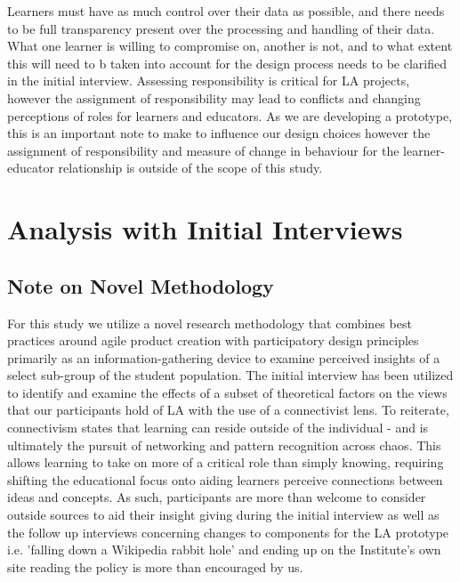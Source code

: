 \documentclass{l4proj}
\begin{document}
Learners must have as much control over their data as possible, and there needs to be full transparency present over the processing and handling of their data. What one learner is willing to compromise on, another is not, and to what extent this will need to b taken into account for the design process needs to be clarified in the initial interview. Assessing responsibility is critical for LA projects, however the assignment of responsibility may lead to conflicts and changing perceptions of roles for learners and educators. As we are developing a prototype, this is an important note to make to influence our design choices however the assignment of responsibility and measure of change in behaviour for the learner-educator relationship is outside of the scope of this study.




\chapter{Analysis with Initial Interviews}

\section{Note on Novel Methodology}
For this study we utilize a novel research methodology that combines best practices around agile product creation with participatory design principles primarily as an information-gathering device to examine perceived insights of a select sub-group of the student population. The initial interview has been utilized to identify and examine the effects of a subset of theoretical factors on the views that our participants hold of LA with the use of a connectivist lens. To reiterate, connectivism states that learning can reside outside of the individual - and is ultimately the pursuit of networking and pattern recognition across chaos. This allows learning to take on more of a critical role than simply knowing, requiring shifting the educational focus onto aiding learners perceive connections between ideas and concepts. As such, participants are more than welcome to consider outside sources to aid their insight giving during the initial interview as well as the follow up interviews concerning changes to components for the LA prototype i.e. 'falling down a Wikipedia rabbit hole' and ending up on the Institute's own site reading the policy is more than encouraged by us.
\end{document}
